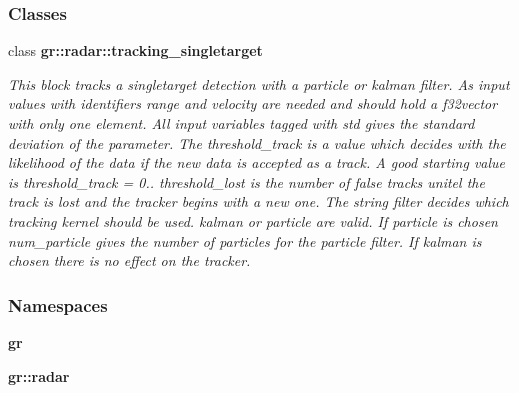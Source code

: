 \subsubsection*{Classes}
\begin{DoxyCompactItemize}
\item 
class {\bf gr\+::radar\+::tracking\+\_\+singletarget}
\begin{DoxyCompactList}\small\item\em This block tracks a singletarget detection with a particle or kalman filter. As input values with identifiers \textquotesingle{}range\textquotesingle{} and \textquotesingle{}velocity\textquotesingle{} are needed and should hold a f32vector with only one element. All input variables tagged with std gives the standard deviation of the parameter. The threshold\+\_\+track is a value which decides with the likelihood of the data if the new data is accepted as a track. A good starting value is threshold\+\_\+track = 0.. threshold\+\_\+lost is the number of false tracks unitel the track is lost and the tracker begins with a new one. The string filter decides which tracking kernel should be used. \textquotesingle{}kalman\textquotesingle{} or \textquotesingle{}particle\textquotesingle{} are valid. If \textquotesingle{}particle\textquotesingle{} is chosen num\+\_\+particle gives the number of particles for the particle filter. If \textquotesingle{}kalman\textquotesingle{} is chosen there is no effect on the tracker. \end{DoxyCompactList}\end{DoxyCompactItemize}
\subsubsection*{Namespaces}
\begin{DoxyCompactItemize}
\item 
 {\bf gr}
\item 
 {\bf gr\+::radar}
\end{DoxyCompactItemize}
